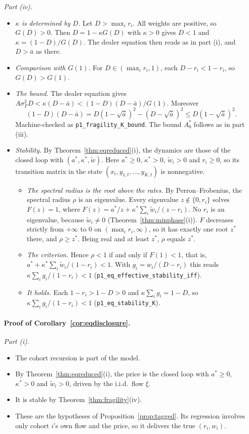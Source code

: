 \documentclass[12pt]{article}
\theoremstyle{definition}
\theoremstyle{remark}
\begin{document}
\emph{Part (iv).}
\begin{itemize}[itemsep=1pt,topsep=2pt]
\item \emph{$\kappa$ is determined by $D$.} Let $D>\max_ir_i$. All weights are positive, so $G(D)>0$. Then $D=1-\kappa G(D)$ with $\kappa>0$ gives $D<1$ and $\kappa=(1-D)/G(D)$. The dealer equation then reads as in part (i), and $D>\bar a$ as there.
\item \emph{Comparison with $G(1)$.} For $D\in(\max_ir_i,1)$, each $D-r_i<1-r_i$, so $G(D)>G(1)$.
\item \emph{The bound.} The dealer equation gives $A\sigma_F^2D<\kappa(D-\bar a)<(1-D)(D-\bar a)/G(1)$. Moreover
\[
 (1-D)(D-\bar a)=D(1-\sqrt{\bar a})^2-(D-\sqrt{\bar a})^2\le D(1-\sqrt{\bar a})^2.
\]
Machine-checked as \nolinkurl{p1_fragility_K_bound}. The bound $A^*_0$ follows as in part (iii).
\item \emph{Stability.} By Theorem~\ref{thm:eqreduced}(i), the dynamics are those of the closed loop with $(a^*,\kappa^*,\tilde w)$. Here $a^*\ge0$, $\kappa^*>0$, $\tilde w_i>0$ and $r_i\ge0$, so its transition matrix in the state $(x_t,y_{1,t},\ldots,y_{K,t})$ is nonnegative.
 \begin{itemize}[itemsep=1pt,topsep=2pt]
 \item \emph{The spectral radius is the root above the rates.} By Perron--Frobenius, the spectral radius $\rho$ is an eigenvalue. Every eigenvalue $z\notin\{0,r_i\}$ solves $F(z)=1$, where $F(z)=a^*/z+\kappa^*\sum_i\tilde w_i/(z-r_i)$. No $r_i$ is an eigenvalue, because $\tilde w_i\ne0$ (Theorem~\ref{thm:minphase}(i)). $F$ decreases strictly from $+\infty$ to $0$ on $(\max_ir_i,\infty)$, so it has exactly one root $z^*$ there, and $\rho\ge z^*$. Being real and at least $z^*$, $\rho$ equals $z^*$.
 \item \emph{The criterion.} Hence $\rho<1$ if and only if $F(1)<1$, that is, $a^*+\kappa^*\sum_i\tilde w_i/(1-r_i)<1$. With $g_i=w_i/(D-r_i)$ this reads $\kappa\sum_ig_i/(1-r_i)<1$ (\nolinkurl{p1_eq_effective_stability_iff}).
 \item \emph{It holds.} Each $1-r_i>1-D>0$ and $\kappa\sum_ig_i=1-D$, so $\kappa\sum_ig_i/(1-r_i)<1$ (\nolinkurl{p1_eq_stability_K}).
 \end{itemize}
\end{itemize}

\paragraph{Proof of Corollary~\ref{cor:eqdisclosure}.}
\emph{Part (i).}
\begin{itemize}[itemsep=1pt,topsep=2pt]
\item The cohort recursion is part of the model.
\item By Theorem~\ref{thm:eqreduced}(i), the price is the closed loop with $a^*\ge0$, $\kappa^*>0$ and $\tilde w_i>0$, driven by the i.i.d.\ flow $\xi$.
\item It is stable by Theorem~\ref{thm:fragility}(iv).
\item These are the hypotheses of Proposition~\ref{prop:tagged}. Its regression involves only cohort $i$'s own flow and the price, so it delivers the true $(r_i,w_i)$.
\end{itemize}
\end{document}
